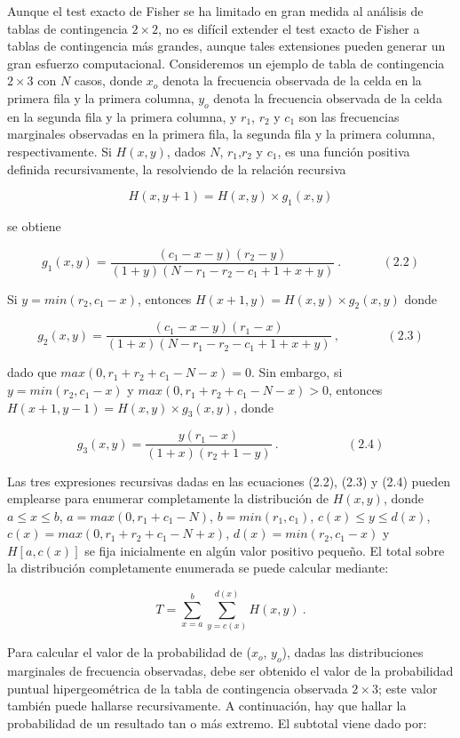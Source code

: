 \documentclass[12pt,a4paper,]{book}
\numberwithin{dummy}{section}
\theoremstyle{ocrenumbox}
\theoremstyle{blacknumex}
\theoremstyle{blacknumbox}
\theoremstyle{ocrenum}
\theoremstyle{ocrenum}
\begin{document}
Aunque el test exacto de Fisher se ha limitado en gran medida al
análisis de tablas de contingencia \(2\times2\), no es difícil extender
el test exacto de Fisher a tablas de contingencia más grandes, aunque
tales extensiones pueden generar un gran esfuerzo computacional.
Consideremos un ejemplo de tabla de contingencia \(2\times3\) con \(N\)
casos, donde \(x_o\) denota la frecuencia observada de la celda en la
primera fila y la primera columna, \(y_o\) denota la frecuencia
observada de la celda en la segunda fila y la primera columna, y
\(r_1\), \(r_2\) y \(c_1\) son las frecuencias marginales observadas en
la primera fila, la segunda fila y la primera columna, respectivamente.
Si \(H(x, y)\), dados \(N\), \(r_1\),\(r_2\) y \(c_1\), es una función
positiva definida recursivamente, la resolviendo de la relación
recursiva

\[
H(x,y+1)=H(x,y)\times g_1(x,y)
\]

se obtiene

\[
g_1(x,y)=\frac{(c_1-x-y)(r_2-y)}{(1+y)(N-r_1-r_2-c_1+1+x+y)}~.~~~~~~~~~~~~~~~(2.2)
\]

Si \(y = min(r_2, c_1 - x)\), entonces
\(H(x + 1, y) = H(x, y) \times g_2(x, y)\) donde

\[
g_2(x,y)=\frac{(c_1-x-y)(r_1-x)}{(1+x)(N-r_1-r_2-c_1+1+x+y)}~,~~~~~~~~~~~~~~~~~(2.3)
\]

dado que \(max(0, r_1 + r_2 + c_1 - N - x) = 0\). Sin embargo, si
\(y = min(r_2, c_1 - x)\) y \(max(0, r_1 + r_2 + c_1 - N - x) > 0\),
entonces \(H(x + 1, y - 1) = H(x, y) \times g_3(x, y)\), donde

\[
g_3(x,y)=\frac{y(r_1-x)}{(1+x)(r_2+1-y)}~.~~~~~~~~~~~~~~~~~~~~~~~~~(2.4)
\]

Las tres expresiones recursivas dadas en las ecuaciones (2.2), (2.3) y
(2.4) pueden emplearse para enumerar completamente la distribución de
\(H(x, y)\), donde \(a \le x \le b\), \(a = max(0, r_1 + c_1 - N)\),
\(b = min(r_1, c_1)\), \(c(x)\le y \le d(x)\),
\(c(x) = max(0, r_1 + r_2 + c_1 - N + x)\), \(d(x) = min(r_2, c_1 - x)\)
y \(H[a, c(x)]\) se fija inicialmente en algún valor positivo pequeño.
El total sobre la distribución completamente enumerada se puede calcular
mediante:

\[
T=\sum_{x=a}^b\sum_{y=c(x)}^{d(x)}H(x,y)~.
\]

Para calcular el valor de la probabilidad de (\(x_o\), \(y_o\)), dadas
las distribuciones marginales de frecuencia observadas, debe ser
obtenido el valor de la probabilidad puntual hipergeométrica de la tabla
de contingencia observada \(2\times3\); este valor también puede
hallarse recursivamente. A continuación, hay que hallar la probabilidad
de un resultado tan o más extremo. El subtotal viene dado por:
\end{document}
